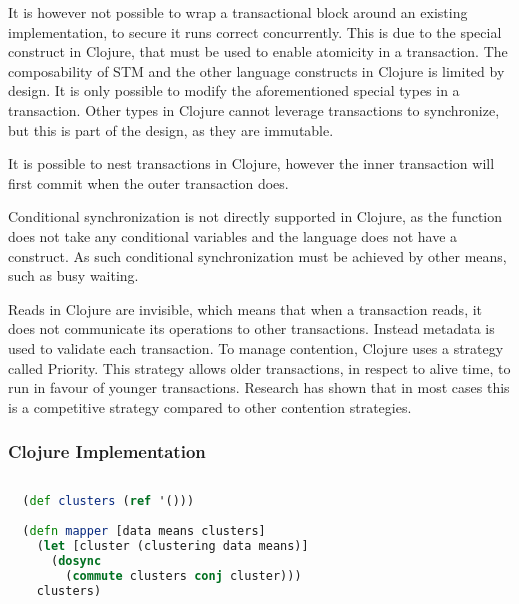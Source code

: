 It is however not possible to wrap a transactional block around an existing implementation, to secure it runs correct concurrently. This is due to the special  construct in Clojure, that must be used to enable atomicity in a transaction. The composability of \ac{STM} and the other language constructs in Clojure is limited by design. It is only possible to modify the aforementioned special types in a transaction. Other types in Clojure cannot leverage transactions to synchronize, but this is part of the design, as they are immutable. 

It is possible to nest transactions in Clojure, however the inner transaction will first commit when the outer transaction does.

Conditional synchronization is not directly supported in Clojure, as the  function does not take any conditional variables and the language does not have a  construct. As such conditional synchronization must be achieved by other means, such as busy waiting.

Reads in Clojure are invisible\cite{nielsen2010benchmarking}, which means that when a transaction reads, it does not communicate its operations to other transactions. Instead metadata is used to validate each transaction. To manage contention, Clojure uses a strategy called Priority\cite{nielsen2010benchmarking}. This strategy allows older transactions, in respect to alive time, to run in favour of younger transactions. Research\cite{nielsen2010benchmarking} has shown that in most cases this is a competitive strategy compared to other contention strategies. 

\subsubsection{Clojure Implementation}
\begin{lstlisting}[float,label=lst:stm_implementation,
  caption={\ac{STM} Implementation},
  language=clojure,  
  showspaces=false,
  showtabs=false,
  breaklines=true,
  showstringspaces=false,
  breakatwhitespace=true,
  commentstyle=\color{greencomments},
  keywordstyle=\color{bluekeywords},
  stringstyle=\color{redstrings}]  % Start your code-block
  
  (def clusters (ref '()))
    
  (defn mapper [data means clusters]
    (let [cluster (clustering data means)]
      (dosync
        (commute clusters conj cluster)))
    clusters)
\end{lstlisting}

